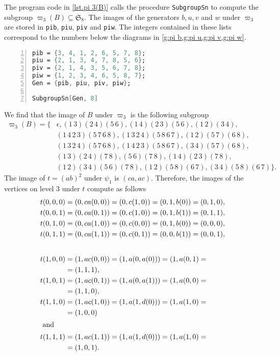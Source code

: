 The program code in \cref{lst.pi 3(B)} calls the procedure \verb+SubgroupSn+ to compute the subgroup $\varpi_3(B)\subseteq\mathfrak{S}_8$. The images of the generators $b,u,v$ and $w$ under $\varpi_3$ are stored in \verb+pib+, \verb+piu+, \verb+piv+ and \verb+piw+. The integers contained in these lists correspond to the numbers below the diagrams in \cref{g:pi b,g:pi u,g:pi v,g:pi w}.
\begin{lstlisting}[float, caption=Computing $\varpi_3(B)\subseteq\mathfrak{S}_8$,
                   label=lst.pi 3(B),
                   language=Mathematica, 
                   numbers=left,
                   numberstyle=\tiny,
                   stepnumber=2,
                   numbersep=5pt]
pib = {3, 4, 1, 2, 6, 5, 7, 8};
piu = {2, 1, 3, 4, 7, 8, 5, 6};
piv = {2, 1, 4, 3, 5, 6, 7, 8};
piw = {1, 2, 3, 4, 6, 5, 8, 7};
Gen = {pib, piu, piv, piw};

SubgroupSn[Gen, 8]
\end{lstlisting}
We find that the image of $B$ under $\varpi_3$ is the following subgroup
\begin{align*}
\varpi_3(B)=\lbrace	&\epsilon,(1\, 3)(2\, 4)(5\, 6),   (1\, 4)(2\, 3)(5\, 6), (1\, 2)(3\, 4),\\
                    & (1\, 4\, 2\, 3)(5\, 7\, 6\, 8),	(1\, 3\, 2\, 4)(5\, 8\, 6\, 7),   (1\, 2)(5\, 7)(6\, 8),\\
                    & (1\, 3\, 2\, 4)(5\, 7\, 6\, 8),	(1\, 4\, 2\, 3)(5\, 8\, 6\, 7),   (3\, 4)(5\, 7)(6\, 8),\\
                    & (1\, 3)(2\, 4)(7\, 8),   (5\, 6)(7\, 8), 
                    (1\, 4)(2\, 3)(7\, 8),\\
                    & (1\, 2)(3\, 4)(5\, 6)(7\, 8),   (1\, 2)(5\, 8)(6\, 7), (3\, 4)(5\, 8)(6\, 7)\rbrace.
\end{align*}
The image of $t=(ab)^2$ under $\psi_1$ is $(ca,ac)$. Therefore, the images of the vertices on level 3 under $t$ compute as follows
\begin{align*}
t(0,0,0)&=(0,ca(0,0))=(0,c(1,0))=(0,1,b(0))=(0,1,0),\\
t(0,0,1)&=(0,ca(0,1))=(0,c(1,0))=(0,1,b(1))=(0,1,1),\\
t(0,1,0)&=(0,ca(1,0))=(0,c(0,0))=(0,1,b(0))=(0,0,0),\\
t(0,1,1)&=(0,ca(1,1))=(0,c(0,1))=(0,0,b(1))=(0,0,1),\\[2em]
t(1,0,0)&=(1,ac(0,0))=(1,a(0,a(0)))=(1,a(0,1)=\\
        &=(1,1,1),\\
t(1,0,1)&=(1,ac(0,1))=(1,a(0,a(1)))=(1,a(0,0)=\\
        &=(1,1,0),\\
t(1,1,0)&=(1,ac(1,0))=(1,a(1,d(0)))=(1,a(1,0)=\\
        &=(1,0,0)\\
\intertext{ and}
t(1,1,1)&=(1,ac(1,1))=(1,a(1,d(0)))=(1,a(1,0)=\\
        &=(1,0,1).
\end{align*}
